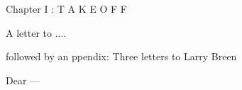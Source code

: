 
Chapter I : T A K E \unsure{-} O F F

A letter to ....

\hand{(}followed by an ppendix: Three letters to Larry Breen\hand{)}



\margin{\unsure{\#}}

Dear  ---

